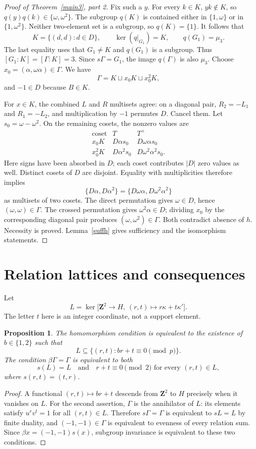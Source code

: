 \documentclass[11pt]{article}
\newtheorem{proposition}[theorem]{Proposition}
\theoremstyle{remark}\newtheorem{remark}[theorem]{Remark}
\newcommand{\Z}{\mathbf Z}
\begin{document}
\begin{proof}[Proof of Theorem~\ref{main3}, part 2]
Fix such a $y$. For every $k\in K$, $yk\notin K$, so $q(y)q(k)\in\{\omega,\omega^2\}$. The subgroup $q(K)$ is contained either in $\{1,\omega\}$ or in $\{1,\omega^2\}$. Neither two-element set is a subgroup, so $q(K)=\{1\}$. It follows that
\[
K=\{(d,d):d\in D\},\qquad \ker(q|_{G_1})=K,\qquad q(G_1)=\mu_3.
\]
The last equality uses that $G_1\ne K$ and $q(G_1)$ is a subgroup. Thus $[G_1:K]=[\Gamma:K]=3$. Since $s\Gamma=G_1$, the image $q(\Gamma)$ is also $\mu_3$. Choose $x_0=(\alpha,\omega\alpha)\in\Gamma$. We have
\[
\Gamma=K\sqcup x_0K\sqcup x_0^2K,
\]
and $-1\in D$ because $B\in K$.

For $x\in K$, the combined $L$ and $R$ multisets agree: on a diagonal pair, $R_2=-L_1$ and $R_1=-L_2$, and multiplication by $-1$ permutes $D$. Cancel them. Let $s_0=\omega-\omega^2$. On the remaining cosets, the nonzero values are
\[
\begin{array}{c|cc}
\text{coset}&T&T^+\\\hline
x_0K&D\alpha s_0&D\omega\alpha s_0\\
x_0^2K&D\alpha^2 s_0&D\omega^2\alpha^2s_0.
\end{array}
\]
Here signs have been absorbed in $D$; each coset contributes $|D|$ zero values as well. Distinct cosets of $D$ are disjoint. Equality with multiplicities therefore implies
\[
\{D\alpha,D\alpha^2\}=\{D\omega\alpha,D\omega^2\alpha^2\}
\]
as multisets of two cosets. The direct permutation gives $\omega\in D$, hence $(\omega,\omega)\in\Gamma$. The crossed permutation gives $\omega^2\alpha\in D$; dividing $x_0$ by the corresponding diagonal pair produces $(\omega,\omega^2)\in\Gamma$. Both contradict absence of $h$. Necessity is proved. Lemma~\ref{suffh} gives sufficiency and the isomorphism statements.
\end{proof}

\section{Relation lattices and consequences}
Let
\[
L=\ker\bigl[\Z^2\to H,\ (r,t)\mapsto r\kappa+t\kappa'\bigr].
\]
The letter $t$ here is an integer coordinate, not a support element.
\begin{proposition}\label{lattice}
The homomorphism condition is equivalent to the existence of $b\in\{1,2\}$ such that
\[
L\subseteq\{(r,t):br+t\equiv0\pmod p\}.
\]
The condition $\beta\Gamma=\Gamma$ is equivalent to both
\[
s(L)=L\quad\text{and}\quad r+t\equiv0\pmod2\text{ for every }(r,t)\in L,
\]
where $s(r,t)=(t,r)$.
\end{proposition}
\begin{proof}
A functional $(r,t)\mapsto br+t$ descends from $\Z^2$ to $H$ precisely when it vanishes on $L$. For the second assertion, $\Gamma$ is the annihilator of $L$: its elements satisfy $u^rv^t=1$ for all $(r,t)\in L$. Therefore $s\Gamma=\Gamma$ is equivalent to $sL=L$ by finite duality, and $(-1,-1)\in\Gamma$ is equivalent to evenness of every relation sum. Since $\beta x=(-1,-1)s(x)$, subgroup invariance is equivalent to these two conditions.
\end{proof}
\end{document}
